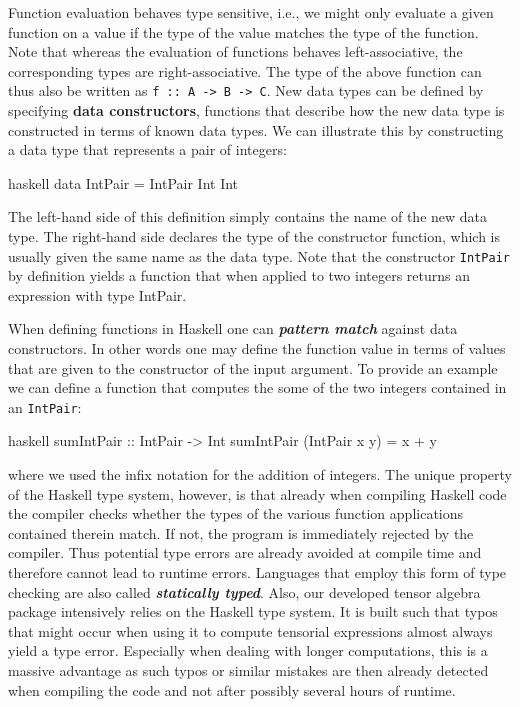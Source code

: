 \documentclass[a4paper,12pt, DIV=14, BCOR=5mm, twoside, headsepline, numbers=noenddot]{scrbook}
\begin{document}
Function evaluation behaves type sensitive, i.e., we might only evaluate a given function on a value if the type of the value matches the type of the function.
Note that whereas the evaluation of functions behaves left-associative, the corresponding types are right-associative. The type of the above function can thus also be written as \texttt{f :: A -> B -> C}.
New data types can be defined by specifying \textbf{\textbf{data constructors}}, functions that describe how the new data type is constructed in terms of known data types. We can illustrate this by constructing a data type that represents a pair of integers:
\begin{center}
\begin{cminted}{haskell}
data IntPair = IntPair Int Int 
\end{cminted}
\end{center}
The left-hand side of this definition simply contains the name of the new data type. The right-hand side declares the type of the constructor function, which is usually given the same name as the data type. 
Note that the constructor \texttt{IntPair} by definition yields a function that when applied to two integers returns an expression with type IntPair. 

When defining functions in Haskell one can \textbf{\textit{pattern match}} against data constructors. In other words one may define the function value in terms of values that are given to the constructor of the input argument. To provide an example we can define a function that computes the some of the two integers contained in an \texttt{IntPair}:
\begin{center}
\begin{cminted}{haskell}
sumIntPair :: IntPair -> Int 
sumIntPair (IntPair x y) = x + y
\end{cminted}
\end{center}
where we used the infix notation for the addition of integers. 
The unique property of the Haskell type system, however, is that already when compiling Haskell code the compiler checks whether the types of the various function applications contained therein match. If not, the program is immediately rejected by the compiler. Thus potential type errors are already avoided at compile time and therefore cannot lead to runtime errors. Languages that employ this form of type checking are also called \textit{\textbf{statically typed}}. Also, our developed tensor algebra package intensively relies on the Haskell type system. It is built such that typos that might occur when using it to compute tensorial expressions almost always yield a type error. Especially when dealing with longer computations, this is a massive advantage as such typos or similar mistakes are then already detected when compiling the code and not after possibly several hours of runtime.  
\end{document}
